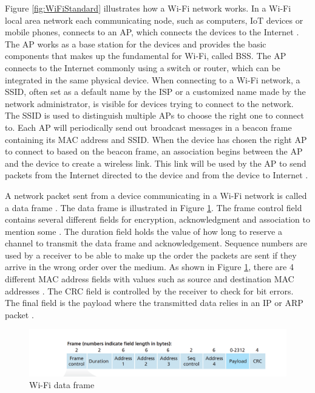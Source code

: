 Figure \ref{fig:WiFiStandard} illustrates how a \gls{Wi-Fi} network works. In a \gls{Wi-Fi} local area network each communicating node, such as computers, \gls{IoT} devices or mobile phones, connects to an \gls{AP}, which connects the devices to the Internet \cite{Datacom}. The \gls{AP} works as a base station for the devices and provides the basic components that makes up the fundamental for \gls{Wi-Fi}, called \gls{BSS}. The \gls{AP} connects to the Internet commonly using a switch or router, which can be integrated in the same physical device. When connecting to a \gls{Wi-Fi} network, a \gls{SSID}, often set as a default name by the \gls{ISP} or a customized name made by the network administrator, is visible for devices trying to connect to the network. The \gls{SSID} is used to distinguish multiple \gls{AP}s to choose the right one to connect to. Each \gls{AP} will periodically send out broadcast messages in a beacon frame containing its \gls{MAC} address and \gls{SSID}. When the device has chosen the right \gls{AP} to connect to based on the beacon frame, an association begins between the \gls{AP} and the device to create a wireless link. This link will be used by the \gls{AP} to send packets from the Internet directed to the device and from the device to Internet \cite{Datacom}. 

A network packet sent from a device communicating in a \gls{Wi-Fi} network is called a data frame \cite{Datacom}. The data frame is illustrated in Figure \ref{fig:WiFiDataframe}. The frame control field contains several different fields for encryption, acknowledgment and association to mention some \cite{Datacom}. The duration field holds the value of how long to reserve a channel to transmit the data frame and acknowledgement. Sequence numbers are used by a receiver to be able to make up the order the packets are sent if they arrive in the wrong order over the medium. As shown in Figure \ref{fig:WiFiDataframe}, there are 4 different \gls{MAC} address fields with values such as source and destination \gls{MAC} addresses \cite{WifiStandard}. The \gls{CRC} field is controlled by the receiver to check for bit errors. The final field is the payload where the transmitted data relies in an \gls{IP} or \gls{ARP} packet \cite{Datacom}. 

\begin{figure} [!h]
    \includegraphics[width=1\textwidth]{figures/WifiDataFrame.png}
    \caption{\gls{Wi-Fi} data frame \cite{Datacom}}
    \centering
    \label{fig:WiFiDataframe}
\end{figure}

